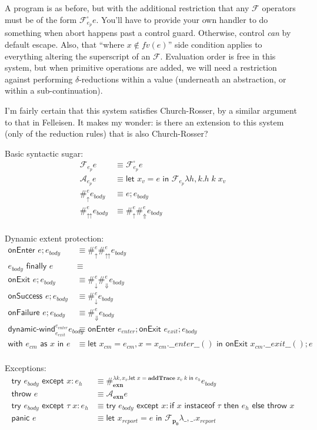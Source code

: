 \documentclass[11pt]{article}
\newcommand{\letin}[2]{\textsf{let }#1\textsf{ in }#2}
\newcommand\F{\mathcal{F}}
\begin{document}
A program is as before, but with the additional restriction that any $\F$ operators must be of the form $\F^\square_{e_p}e$.
You'll have to provide your own handler to do something when abort happens past a control guard. Otherwise, control \emph{can} by default escape.
Also, that ``where $x \notin fv(e)$'' side condition applies to everything altering the superscript of an $\F$.
Evaluation order is free in this system, but when primitive operations are added, we will need a restriction against performing $\delta$-reductions within a value (underneath an abstraction, or within a sub-continuation).

I'm fairly certain that this system satisfies Church-Rosser, by a similar argument to that in Felleisen.
It makes my wonder: is there an extension to this system (only of the reduction rules) that is also Church-Rosser?

Basic syntactic sugar:
\begin{align*}
\F_{e_p}e &\equiv \F_{e_p}^\square e \\
\mathcal A_{e_p}e &\equiv
	\letin{x_v=e}{\F_{e_p}\lambda h,k.h\;k\;x_v}
	\\
\#_\uparrow^ee_{body} &\equiv
	e; e_{body}
	\\
\#_\upuparrows^ee_{body} &\equiv
	\#_\uparrow^e\#_\Uparrow^ee_{body}
	\\
\end{align*}

Dynamic extent protection:
\begin{align*}
\textsf{onEnter }e; e_{body} &\equiv
	\#_\uparrow^e\#_\upuparrows^ee_{body}
	\\
e_{body}\textsf{ finally }e &\equiv \\
	\textsf{onExit }e; e_{body} &\equiv
	\#_\downarrow^e\#_\Downarrow^ee_{body}
	\\
\textsf{onSuccess }e; e_{body} &\equiv
	\#_\downarrow^ee_{body}
	\\
\textsf{onFailure }e; e_{body} &\equiv
	\#_\Downarrow^ee_{body}
	\\
\textsf{dynamic-wind}^{e_{enter}}_{e_{exit}}e_{body} &\equiv
	\textsf{onEnter }e_{enter}; \textsf{onExit }e_{exit}; e_{body}
	\\
\textsf{with }e_{cm}\textsf{ as }x\textsf{ in }e &\equiv
	\letin{x_{cm}=e_{cm},x=x_{cm}.\_\_enter\_\_()}{\textsf{onExit }x_{cm}.\_\_exit\_\_(); e}
	\\
\end{align*}

Exceptions:
\begin{align*}
\textsf{try }e_{body}\textsf{ except }x:e_h &\equiv
	\#_\textbf{exn}^{\lambda k,x_v.\letin{x=\textbf{addTrace}\;x_v\;k}{e_h}}e_{body}
	\\
\textsf{throw }e &\equiv
	\mathcal A_\textbf{exn}e
	\\
\textsf{try }e_{body}\textsf{ except }\tau\;x:e_h &\equiv
	\textsf{try }e_{body}\textsf{ except }x:
		\textsf{if }x\textsf{ instaceof }\tau
		\textsf{ then }e_h
		\textsf{ else throw }x
	\\
\textsf{panic }e &\equiv
	\letin{x_{report} = e}{\F_\mathbf{p_0}\lambda \_,\_.x_{report}}
	\\
\end{align*}
\end{document}
